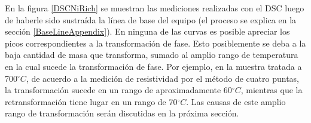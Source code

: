 \documentclass[12pt]{article}
\theoremstyle{definition}
\theoremstyle{remark}
\begin{document}
{En la figura \ref{DSCNiRich} se muestran las mediciones realizadas con el DSC luego de haberle sido sustraída la línea de base del equipo (el proceso se explica en la sección \ref{BaseLineAppendix}). En ninguna de las curvas es posible apreciar los picos correspondientes a la transformación de fase. Esto posiblemente se deba a la baja cantidad de masa que transforma, sumado al amplio rango de temperatura en la cual sucede la transformación de fase. Por ejemplo, en la muestra tratada a 700$^\circ C$, de acuerdo a la medición de resistividad por el método de cuatro puntas, la transformación sucede en un rango de aproximadamente 60$^\circ C$, mientras que la retransformación tiene lugar en un rango de 70$^\circ C$. Las causas de este amplio rango de transformación serán discutidas en la próxima sección.

\begin{figure}[H]

\noindent{}\\
	

\end{figure}}
\end{document}

